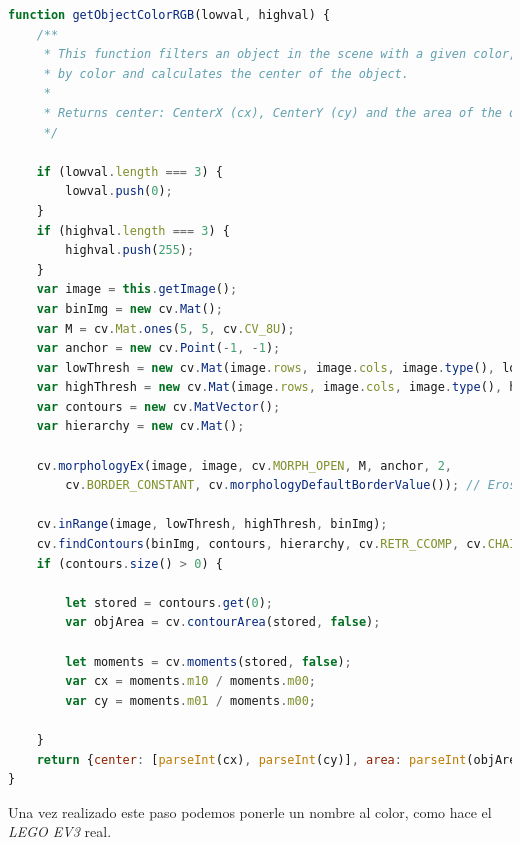     \begin{lstlisting}[language=javascript]
   function getObjectColorRGB(lowval, highval) {
    /**
     * This function filters an object in the scene with a given color, uses OpenCVjs to filter
     * by color and calculates the center of the object.
     *
     * Returns center: CenterX (cx), CenterY (cy) and the area of the object detected in the image.
     */

    if (lowval.length === 3) {
        lowval.push(0);
    }
    if (highval.length === 3) {
        highval.push(255);
    }
    var image = this.getImage();
    var binImg = new cv.Mat();
    var M = cv.Mat.ones(5, 5, cv.CV_8U);
    var anchor = new cv.Point(-1, -1);
    var lowThresh = new cv.Mat(image.rows, image.cols, image.type(), lowval);
    var highThresh = new cv.Mat(image.rows, image.cols, image.type(), highval);
    var contours = new cv.MatVector();
    var hierarchy = new cv.Mat();

    cv.morphologyEx(image, image, cv.MORPH_OPEN, M, anchor, 2,
        cv.BORDER_CONSTANT, cv.morphologyDefaultBorderValue()); // Erosion followed by dilation

    cv.inRange(image, lowThresh, highThresh, binImg);
    cv.findContours(binImg, contours, hierarchy, cv.RETR_CCOMP, cv.CHAIN_APPROX_SIMPLE);
    if (contours.size() > 0) {

        let stored = contours.get(0);
        var objArea = cv.contourArea(stored, false);

        let moments = cv.moments(stored, false);
        var cx = moments.m10 / moments.m00;
        var cy = moments.m01 / moments.m00;

    }
    return {center: [parseInt(cx), parseInt(cy)], area: parseInt(objArea)};
}
    \end{lstlisting}
    
Una vez realizado este paso podemos ponerle un nombre al color, como hace el \textit{LEGO EV3} real.

